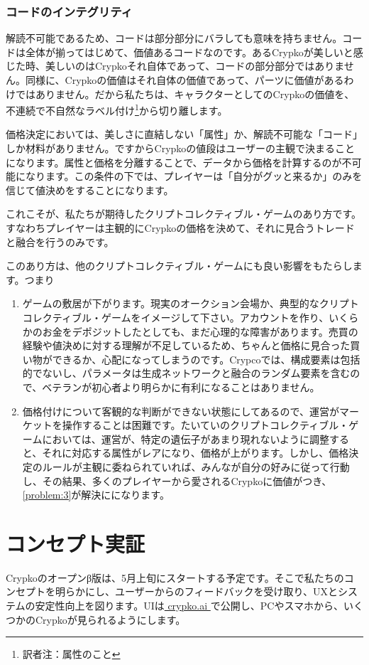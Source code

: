 \documentclass[xelatex,ja=standard]{bxjsarticle}
\begin{document}
\subsubsection{コードのインテグリティ}

解読不可能であるため、コードは部分部分にバラしても意味を持ちません。コードは全体が揃ってはじめて、価値あるコードなのです。あるCrypkoが美しいと感じた時、美しいのはCrypkoそれ自体であって、コードの部分部分ではありません。同様に、Crypkoの価値はそれ自体の価値であって、パーツに価値があるわけではありません。だから私たちは、キャラクターとしてのCrypkoの価値を、不連続で不自然なラベル付け\footnote{訳者注：属性のこと}から切り離します。

価格決定においては、美しさに直結しない「属性」か、解読不可能な「コード」しか材料がありません。ですからCrypkoの値段はユーザーの主観で決まることになります。属性と価格を分離することで、データから価格を計算するのが不可能になります。この条件の下では、プレイヤーは「自分がグッと来るか」のみを信じて値決めをすることになります。

これこそが、私たちが期待したクリプトコレクティブル・ゲームのあり方です。すなわちプレイヤーは主観的にCrypkoの価格を決めて、それに見合うトレードと融合を行うのみです。

このあり方は、他のクリプトコレクティブル・ゲームにも良い影響をもたらします。つまり

\begin{enumerate}
	\item ゲームの敷居が下がります。現実のオークション会場か、典型的なクリプトコレクティブル・ゲームをイメージして下さい。アカウントを作り、いくらかのお金をデポジットしたとしても、まだ心理的な障害があります。売買の経験や値決めに対する理解が不足しているため、ちゃんと価格に見合った買い物ができるか、心配になってしまうのです。Crypcoでは、構成要素は包括的でないし、パラメータは生成ネットワークと融合のランダム要素を含むので、ベテランが初心者より明らかに有利になることはありません。
	\item 価格付けについて客観的な判断ができない状態にしてあるので、運営がマーケットを操作することは困難です。たいていのクリプトコレクティブル・ゲームにおいては、運営が、特定の遺伝子があまり現れないように調整すると、それに対応する属性がレアになり、価格が上がります。しかし、価格決定のルールが主観に委ねられていれば、みんなが自分の好みに従って行動し、その結果、多くのプレイヤーから愛されるCrypkoに価値がつき、\ref{problem:3}が解決にになります。

\end{enumerate}

\section{コンセプト実証}
Crypkoのオープンβ版は、5月上旬にスタートする予定です。そこで私たちのコンセプトを明らかにし、ユーザーからのフィードバックを受け取り、UXとシステムの安定性向上を図ります。UIは\href{http://crypko.ai}{ crypko.ai }で公開し、PCやスマホから、いくつかのCrypkoが見られるようにします。
\end{document}
